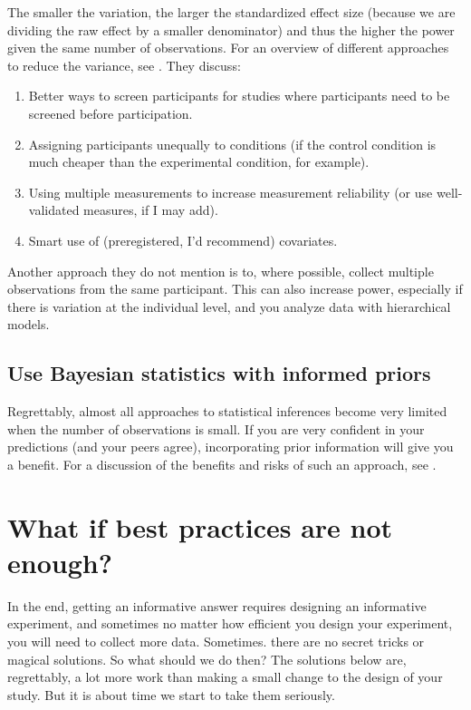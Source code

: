 \documentclass[
]{krantz}
\providecommand{\tightlist}{%
  \setlength{\itemsep}{0pt}\setlength{\parskip}{0pt}}
\begin{document}
The smaller the variation, the larger the standardized effect size (because we are dividing the raw effect by a smaller denominator) and thus the higher the power given the same number of observations. For an overview of different approaches to reduce the variance, see \citet{allison_power_1997}. They discuss:

\begin{enumerate}
\def\labelenumi{\arabic{enumi}.}
\tightlist
\item
  Better ways to screen participants for studies where participants need to be screened before participation.
\item
  Assigning participants unequally to conditions (if the control condition is much cheaper than the experimental condition, for example).
\item
  Using multiple measurements to increase measurement reliability (or use well-validated measures, if I may add).
\item
  Smart use of (preregistered, I'd recommend) covariates.
\end{enumerate}

Another approach they do not mention is to, where possible, collect multiple observations from the same participant. This can also increase power, especially if there is variation at the individual level, and you analyze data with hierarchical models.

\hypertarget{use-bayesian-statistics-with-informed-priors}{%
\subsection{Use Bayesian statistics with informed priors}\label{use-bayesian-statistics-with-informed-priors}}

Regrettably, almost all approaches to statistical inferences become very limited when the number of observations is small. If you are very confident in your predictions (and your peers agree), incorporating prior information will give you a benefit. For a discussion of the benefits and risks of such an approach, see \citet{van_de_schoot_analyzing_2015}.

\hypertarget{what-if-best-practices-are-not-enough}{%
\section{What if best practices are not enough?}\label{what-if-best-practices-are-not-enough}}

In the end, getting an informative answer requires designing an informative experiment, and sometimes no matter how efficient you design your experiment, you will need to collect more data. Sometimes. there are no secret tricks or magical solutions. So what should we do then? The solutions below are, regrettably, a lot more work than making a small change to the design of your study. But it is about time we start to take them seriously.
\end{document}
